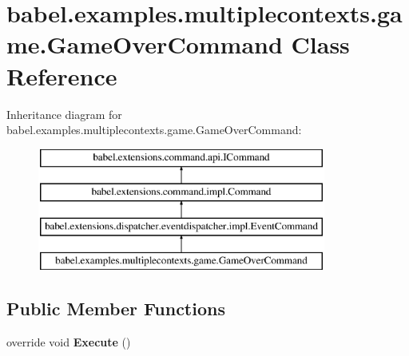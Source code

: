 \hypertarget{classbabel_1_1examples_1_1multiplecontexts_1_1game_1_1_game_over_command}{\section{babel.\-examples.\-multiplecontexts.\-game.\-Game\-Over\-Command Class Reference}
\label{classbabel_1_1examples_1_1multiplecontexts_1_1game_1_1_game_over_command}
}
Inheritance diagram for babel.\-examples.\-multiplecontexts.\-game.\-Game\-Over\-Command\-:\begin{figure}[H]
\begin{center}
\leavevmode
\includegraphics[height=4.000000cm]{classbabel_1_1examples_1_1multiplecontexts_1_1game_1_1_game_over_command}
\end{center}
\end{figure}
\subsection*{Public Member Functions}
\begin{DoxyCompactItemize}
\item 
\hypertarget{classbabel_1_1examples_1_1multiplecontexts_1_1game_1_1_game_over_command_af18bdf53aef3ee5c29a2467d78c67fea}{override void {\bfseries Execute} ()}\label{classbabel_1_1examples_1_1multiplecontexts_1_1game_1_1_game_over_command_af18bdf53aef3ee5c29a2467d78c67fea}

\end{DoxyCompactItemize}
